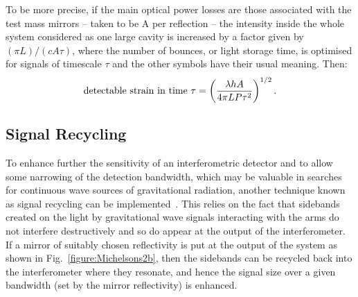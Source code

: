 \documentclass{article}
\begin{document}

To be more precise, if the main optical power losses are those associated with
the test mass mirrors -- taken to be A per reflection -- the intensity inside
the whole system considered as one large cavity is increased by a factor given
by $(\pi L)/(c A \tau)$, where the number of bounces, or light storage time, is
optimised for signals of timescale $\tau$ and the other symbols have their usual
meaning. Then:
%
\begin{equation}
  {\rm detectable\ strain\ in\ time\ } \tau = \left( \frac{\lambda h
  A}{4 \pi L P \tau^2} \right)^{1/2}.
  \label{equation:shotpower}
\end{equation}


\subsection{Signal Recycling}
\label{subsection:sigrec}

To enhance further the sensitivity of an interferometric detector and to allow
some narrowing of the detection bandwidth, which may be valuable in searches for
continuous wave sources of gravitational radiation, another technique known as
signal recycling can be implemented~\cite{Meers, Strain, Heinzel}. This relies
on the fact that sidebands created on the light by gravitational wave signals
interacting with the arms do not interfere destructively and so do appear at the
output of the interferometer. If a mirror of suitably chosen reflectivity is put
at the output of the system as shown in Fig.~\ref{figure:Michelsons2b}, then the
sidebands can be recycled back into the interferometer where they resonate, and
hence the signal size over a given bandwidth (set by the mirror reflectivity) is
enhanced.
\end{document}
